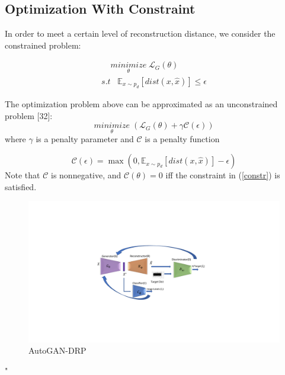 \documentclass[]{elsarticle}
\begin{document}
	\subsection{Optimization With Constraint}
	In order to meet a certain level of reconstruction distance, we consider the constrained problem:
	
	\begin{equation}
	\begin{array}{l}
	\; \; \; \;\underset{\theta}{minimize} \;\mathcal{L}_G(\theta) \\ 
	s.t \; \; \;  \mathbb{E}_{x \sim p_d}[dist(x, \hat{x})] \leq \epsilon  
	\end{array}
	\label{constr}
	\end{equation}
	
	The optimization problem above can be approximated as an unconstrained problem [32]:
	\begin{equation} 
	\underset{\theta}{minimize} \; ( \mathcal{L}_G(\theta) + \gamma \mathcal{C}(\epsilon) )  
	\end{equation}
	where $\gamma$ is a penalty parameter and $\mathcal{C}$ is a penalty function 
	
	\begin{equation} 
	\mathcal{C}(\epsilon) = \max(0, \mathbb{E}_{x \sim p_d}[dist(x, \hat{x})] -\epsilon)
	\end{equation}
	Note that $\mathcal{C}$ is nonnegative, and $\mathcal{C}(\theta)=0$ iff the constraint in (\ref{constr}) is satisfied.
	\setcounter{figure}{2}
	\begin{figure}[H]
		\centering
		\includegraphics[width=1\linewidth]{figures/eGAN}
		\captionsetup{justification=centering}
		\caption{AutoGAN-DRP}
		\label{fig:eGAN}
	\end{figure}
	"  
\end{document}
